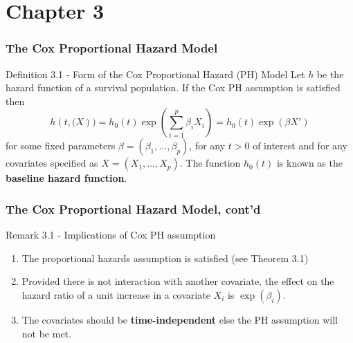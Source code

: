 \documentclass{beamer}
\theoremstyle{definition}
\begin{document}
%
%


\section{Chapter 3}

\begin{frame}
\frametitle{The Cox Proportional Hazard Model}
\begin{block}{Definition 3.1 - Form of the Cox Proportional Hazard (PH) Model}
Let $h$ be the hazard function of a survival population. If the Cox PH assumption is satisfied then
\[
h(t,\mathbf(X)) = h_0(t)\exp\left(\sum_{i=1}^p \beta_i X_i\right) = h_0(t)\exp(\beta X')
\]
for some fixed parameters $\beta=(\beta_1,\ldots,\beta_p)$, for any $t>0$ of interest and for any covariates specified as $X=(X_1,\ldots,X_p)$. The function $h_0(t)$ is known as the \textbf{baseline hazard function}.
\end{block}
\end{frame}

\begin{frame}
\frametitle{The Cox Proportional Hazard Model, cont'd}
\begin{block}{Remark 3.1 - Implications of Cox PH assumption}
\begin{enumerate}
\item The proportional hazards assumption is satisfied (see Theorem 3.1)
\item Provided there is not interaction with another covariate, the effect on the hazard ratio of a unit increase in a covariate $X_i$ is $\exp(\beta_i)$.
\item The covariates should be \textbf{time-independent} else the PH assumption will not be met.
\end{enumerate}
\end{block}
\end{frame}
\end{document}
